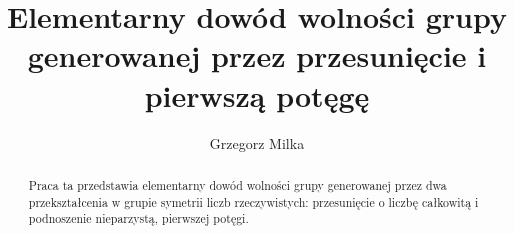 \documentclass{pracamgr}
\title{Elementarny dowód wolności grupy generowanej przez przesunięcie i
pierwszą potęgę}
\author{Grzegorz Milka}
\begin{document}
\maketitle

\begin{abstract}
  Praca ta przedstawia elementarny dowód wolności grupy generowanej przez dwa
  przekształcenia w grupie symetrii liczb rzeczywistych: przesunięcie o liczbę
  całkowitą i podnoszenie nieparzystą, pierwszej potęgi.
\end{abstract}

\tableofcontents





\end{document}
